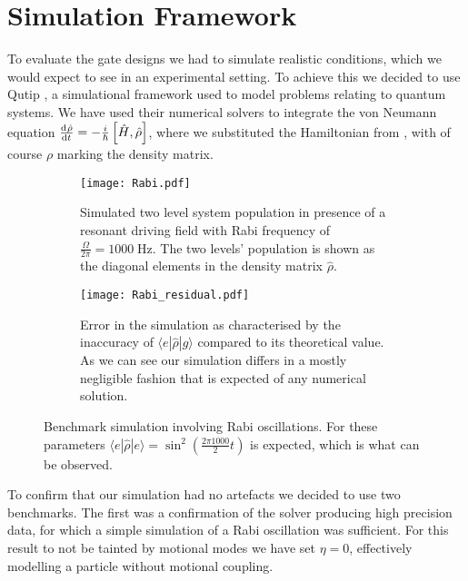 \documentclass[12pt,twoside]{report}
\begin{document}
\chapter{Simulation Framework}
\label{Sim_Framework}

To evaluate the gate designs we had to simulate realistic conditions, which we would expect to see in an experimental setting. To achieve this we decided to use Qutip \cite{QuTip1,QuTip2}, a simulational framework used to model problems relating to quantum systems. We have used their numerical solvers to integrate the von Neumann equation \cite{Shankar_QM} ${\frac{\text{d}^{}\hat{\rho}}{\text{d}t^{}} = -\frac{i}{\hbar}\left[\hat{H},\hat{\rho}\right]}$, where we substituted the Hamiltonian from , with of course $\rho$ marking the density matrix.

\begin{figure}[b!]
	\centering
	\begin{subfigure}[t]{0.475\textwidth}
		\centering
		\texttt{[image: Rabi.pdf]}
		\caption{Simulated two level system population in presence of a resonant driving field with Rabi frequency of $\frac{\Omega}{2\pi} = 1000\;\mathrm{Hz}$. The two levels' population is shown as the diagonal elements in the density matrix $\hat{\rho}$.}
		\label{fig:rabi:measured}
	\end{subfigure}
	\hfill
	\begin{subfigure}[t]{0.475\textwidth}
		\centering
		\texttt{[image: Rabi\_residual.pdf]}
		\caption{Error in the simulation as characterised by the inaccuracy of $\langle e|\hat{\rho}|g\rangle$ compared to its theoretical value. As we can see our simulation differs in a mostly negligible fashion that is expected of any numerical solution.}
		\label{fig:rabi:residual}
	\end{subfigure}
	\caption[Rabi oscillation simulation]{Benchmark simulation involving Rabi oscillations. For these parameters $\langle e|\hat{\rho}|e\rangle = \sin^2\left(\frac{2\pi1000}{2}t\right)$ is expected, which is what can be observed.}
	\label{fig:rabi}
\end{figure}

To confirm that our simulation had no artefacts we decided to use two benchmarks. The first was a confirmation of the solver producing high precision data, for which a simple simulation of a Rabi oscillation was sufficient. For this result to not be tainted by motional modes we have set $\eta =0$, effectively modelling a particle without motional coupling.
\end{document}
